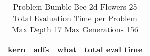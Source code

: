 \begin{table}[H]
\caption{Problem  Bumble Bee 2d  Flowers 25\\Total Evaluation Time per Problem \\ Max Depth 17 Max Generations 156\\}
\begin{center}
\scalebox{1.0} %
{
\begin{tabular}{lllr}
\hline
kern & adfs & what & total eval time \\
\hline


\end{tabular}
}
\end{center}
\end{table}

